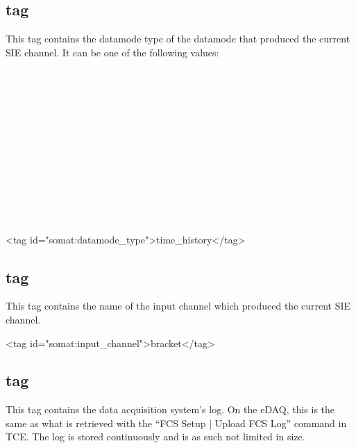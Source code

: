 \documentclass{article}
\begin{document}
\subsection{ tag}

This tag contains the datamode type of the datamode that produced the
current SIE channel.  It can be one of the following values: \\
   \\
   \\
   \\
   \\
   \\
   \\
   \\
   \\
   \\
   \\
   \\
   \\

\begin{siexmlexample}
<tag id="somat:datamode_type">time_history</tag>
\end{siexmlexample}

\subsection{ tag}

This tag contains the name of the input channel which produced the
current SIE channel.

\begin{siexmlexample}
<tag id="somat:input_channel">bracket</tag>
\end{siexmlexample}

\subsection{ tag}

This tag contains the data acquisition system's log.  On the eDAQ,
this is the same as what is retrieved with the ``FCS Setup | Upload
FCS Log'' command in TCE.  The log is stored continuously and is as
such not limited in size.
\end{document}
